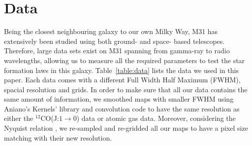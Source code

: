 \documentclass[useAMS,usenatbib]{mn2e}
\begin{document}
\section{Data}
\label{sec:data}
Being the closest neighbouring galaxy to our own Milky Way, M31 has extensively been studied using both ground- and space- based telescopes.
Therefore, large data sets exist on M31 spanning from gamma-ray to radio wavelengths, allowing us to %
measure all the required parameters to test the star formation laws in this galaxy. Table~\ref{table:data} lists the data we used in this paper. Each data comes with a different Full Width Half Maximum (FWHM), spacial resolution and grids. In order to make sure that all our data contains the same amount of information, we smoothed maps with smaller FWHM using Aniano's Kernels' library and convolution code \citep{Aniano12} to have the same resolution as either the $^{12}$CO(J:$1\rightarrow0$) data or atomic gas data. Moreover, considering the Nyquist relation \citep{Nyquist}, we re-sampled and re-gridded all our maps to have a pixel size matching with their new resolution. %
\end{document}

